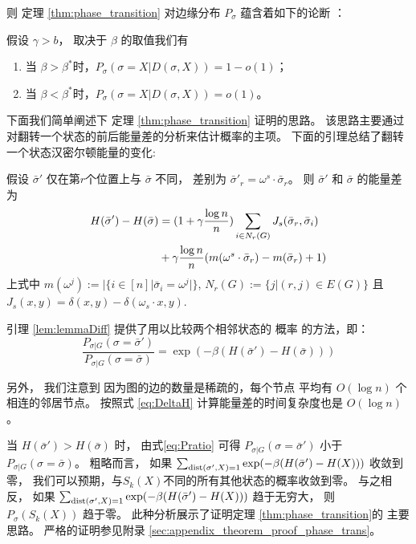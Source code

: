 则 定理 \ref{thm:phase_transition} 
对边缘分布 $P_{\sigma}$ 蕴含着如下的论断
：
\begin{corollary}\label{cor:phase4}
假设 $\gamma > b$， 取决于 $\beta$ 的取值我们有
\begin{enumerate}
	\item 当 $\beta > \beta^*$时，$P_{\sigma}(\sigma = X | D(\sigma, X))  = 1-o(1)$；
	\item 当 $\beta < \beta^*$时，$P_{\sigma}(\sigma = X | D(\sigma, X))  = o(1)$。
\end{enumerate}
\end{corollary}

下面我们简单阐述下 定理 \ref{thm:phase_transition} 证明的思路。
该思路主要通过对翻转一个状态的前后能量差的分析来估计概率的主项。
下面的引理总结了翻转一个状态汉密尔顿能量的变化:
\begin{lemma}\label{lem:lemmaDiff}
	假设 $\bar{\sigma}'$ 仅在第$r$个位置上与 $\bar{\sigma}$ 不同，
	差别为 $\bar{\sigma}'_r = \omega^s \cdot \bar{\sigma}_r$。
	则 $\bar{\sigma}'$ 和 $\bar{\sigma}$ 的能量差为
\begin{align}
	H(\bar{\sigma}') - H(\bar{\sigma}) &= (1+\gamma \frac{\log n}{n})\sum_{i \in N_r(G)} J_s(\bar{\sigma}_r, \bar{\sigma}_i)
	\notag \\
	&+ \gamma \frac{\log n}{n} (m(\omega^s \cdot \bar{\sigma}_r)-m(\bar{\sigma}_r)+1) \label{eq:DeltaH}
	\end{align}
	上式中 $m(\omega^j) := |\{i \in [n] | \bar{\sigma}_i = \omega^j | \}$, $N_r(G):=\{j | (r, j) \in E(G) \}$ 且 $J_s(x, y) = \delta(x, y) - \delta(\omega_s \cdot x, y)$.
\end{lemma}
引理 \ref{lem:lemmaDiff} 提供了用以比较两个相邻状态的    概率
的方法，即：
\begin{equation}\label{eq:Pratio}
\frac{P_{\sigma |G } (\sigma = \bar{\sigma}')}{P_{\sigma |G } (\sigma = \bar{\sigma})}
= \exp(-\beta(H(\bar{\sigma}') - H(\bar{\sigma})))
\end{equation}

另外， 我们注意到 因为图的边的数量是稀疏的，每个节点
平均有 $O(\log n)$ 个相连的邻居节点。
按照式 \eqref{eq:DeltaH} 
计算能量差的时间复杂度也是 $O(\log n)$。

当 $H(\bar{\sigma}') > H(\bar{\sigma})$ 时， 
由式\eqref{eq:Pratio} 可得
$P_{\sigma | G}(\sigma = \bar{\sigma}')$
小于
$P_{\sigma | G}(\sigma = \bar{\sigma})$。
粗略而言， 如果
$ \sum_{\operatorname{dist}(\sigma', X)=1}\exp(-\beta(H(\bar{\sigma}') - H(X))) $
收敛到零，
我们可以预期，与$S_k(X)$不同的所有其他状态的概率收敛到零。
与之相反， 如果
$ \sum_{\operatorname{dist}(\sigma', X)=1}\exp(-\beta(H(\bar{\sigma}') - H(X))) $
趋于无穷大，
则 $P_{\sigma}(S_k(X))$ 趋于零。
此种分析展示了证明定理 \ref{thm:phase_transition}的
主要思路。
严格的证明参见附录 \ref{sec:appendix_theorem_proof_phase_trans}。

